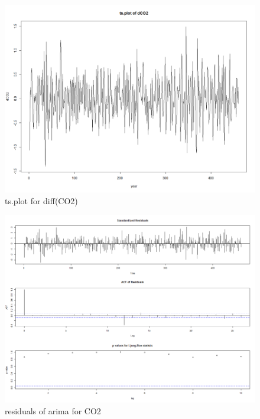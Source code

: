\documentclass[a4paper,11pt]{article}
\begin{document}
\begin{figure}[H]
\centering
\caption{ts.plot for diff(CO2)}
\includegraphics[scale=.80]{Picture1.png}
\end{figure}


\begin{figure}[H]
\centering
\caption{residuals of arima for CO2}
\includegraphics[scale=.80]{Picture2.png}
\end{figure}
\end{document}
